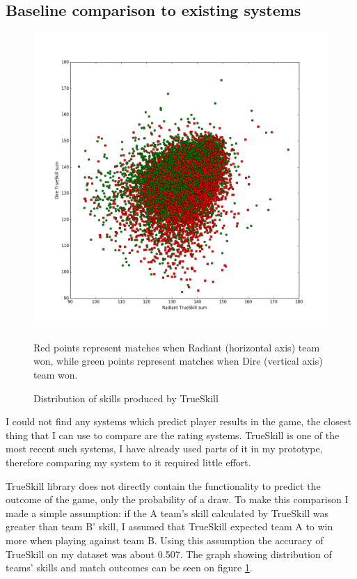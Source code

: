 \documentclass[12pt,a4paper]{book}
\newcommand\note[1]{\vspace*{-0.5\baselineskip}\caption*{#1}}
\begin{document}
\subsection{Baseline comparison to existing systems}
\begin{figure}[ht]
\centering
\includegraphics[scale=0.4]{winrate}
\caption{Distribution of skills produced by TrueSkill}
\note{Red points represent matches when Radiant (horizontal axis) team won, while green points represent matches when Dire (vertical axis) team won.}
\label{fig:winrate}
\end{figure}
I could not find any systems which predict player results in the game, the closest thing that I can use to compare are the rating systems.
TrueSkill is one of the most recent such systems, I have already used parts of it in my prototype, therefore comparing my system to it required little effort.

TrueSkill library does not directly contain the functionality to predict the outcome of the game, only the probability of a draw.
To make this comparison I made a simple assumption: if the A team's skill calculated by TrueSkill was greater than team B' skill, I assumed that TrueSkill expected team A to win more when playing against team B.
Using this assumption the accuracy of TrueSkill on my dataset was about 0.507.
The graph showing distribution of teams' skills and match outcomes can be seen on figure \ref{fig:winrate}.
\end{document}
